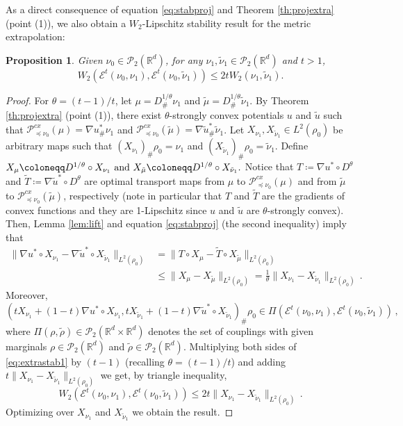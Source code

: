 \documentclass[12pt]{amsart}
\def\mc#1{\mathcal{#1}}
\newtheorem{proposition}{Proposition}
\begin{document}
As a direct consequence of equation \eqref{eq:stabproj} and Theorem \ref{th:projextra} (point (1)), we also obtain a $W_2$-Lipschitz stability result for the metric extrapolation:
\begin{proposition}\label{prop:extralip} Given  $\nu_0 \in \mc{P}_2(\mathbb{R}^d)$, for any $\nu_1, \tilde{\nu}_1\in\mc{P}_2(\mathbb{R}^d)$ and $t>1$,
\begin{equation}\label{eq:extralip}
W_2(\mathscr{E}^t(\nu_0,\nu_1),\mathscr{E}^t(\nu_0,\tilde{\nu}_1)) \leq 2t W_2(\nu_1,\tilde{\nu}_1).
\end{equation}
\end{proposition}
\begin{proof} 
For $\theta = (t-1)/t$, 
let $\mu = D^{1/\theta}_\# \nu_1$ and $ \tilde{\mu} = D^{1/\theta}_\# \tilde{\nu}_1$. By Theorem \ref{th:projextra} (point (1)), there exist $\theta$-strongly convex potentials $u$ and $\tilde{u}$ such that $\mathscr{P}^{cx}_{\preceq \nu_0}(\mu) = \nabla u^*_\# \nu_1$ and $\mathscr{P}^{cx}_{\preceq \nu_0}(\tilde{\mu}) = \nabla \tilde{u}^*_\# \tilde{\nu}_1$. 
Let $X_{\nu_1}, X_{\tilde{\nu}_1}\in L^2(\rho_0)$ be arbitrary maps such that $(X_{\nu_1})_\# \rho_0 = \nu_1$ and $(X_{\tilde{\nu}_1})_\# \rho_0 = \tilde{\nu}_1$. 
{Define
$\hbox{$X_\mu \coloneqq D^{1/\theta} \circ X_{\nu_1}$ and $X_{\tilde{\mu}} \coloneqq D^{1/\theta} \circ X_{\tilde{\nu}_1}$.}$
 Notice that  $T\coloneqq \nabla u^* \circ D^{\theta}$ and $\tilde{T} \coloneqq \nabla \tilde{u}^* \circ D^\theta$ are optimal transport maps  from $\mu$ to $\mathscr{P}^{cx}_{\preceq \nu_0}(\mu)$ and from $\tilde{\mu}$ to $\mathscr{P}^{cx}_{\preceq \nu_0}(\tilde{\mu})$, respectively (note in particular that $T$ and $\tilde{T}$ are the gradients of convex functions and they are 1-Lipschitz since $u$ and $\tilde{u}$ are} $\theta$-strongly convex).
Then, Lemma \ref{lem:lift} and equation \eqref{eq:stabproj} (the second inequality) imply that
\begin{align}\label{eq:extrastab1}
\|\nabla u^*\circ X_{\nu_1} - \nabla \tilde{u}^*\circ X_{\tilde{\nu}_1}\|_{L^2(\rho_0)}&  = \| T\circ X_\mu - \tilde{T}\circ X_{\tilde{\mu}} \|_{L^2(\rho_0)} \\\nonumber
& \le  \|  X_\mu -  X_{\tilde{\mu}} \|_{L^2(\rho_0)}
 = \frac{1}{\theta} \|X_{\nu_1} - X_{\tilde{\nu}_1}\|_{L^2(\rho_0)}\,.
\end{align}
Moreover, \[(tX_{\nu_1} + (1-t) \nabla u^*\circ X_{\nu_1},tX_{\tilde{\nu}_1} + (1-t)  \nabla \tilde{u}^*\circ X_{\tilde{\nu}_1})_\# \rho_0 \in \Pi(\mathscr{E}^t(\nu_0,\nu_1), \mathscr{E}^t(\nu_0,\tilde{\nu}_1))\,,\]
where $\Pi(\rho,\tilde{\rho})\in\mc{P}_2(\mathbb{R}^d\times \mathbb{R}^d)$ denotes the set of couplings with given marginals $\rho\in\mc{P}_2(\mathbb{R}^d)$ and $\tilde{\rho}\in\mc{P}_2(\mathbb{R}^d)$. Multiplying both sides of \eqref{eq:extrastab1} by $(t-1)$ (recalling $\theta = (t-1)/t$) and adding $t\|X_{\nu_1} - X_{\tilde{\nu}_1}\|_{L^2(\rho_0)}$ we get, by triangle inequality,
\[
{W_2(\mathscr{E}^t(\nu_0,\nu_1),\mathscr{E}^t(\nu_0,\tilde{\nu}_1))}\leq  2  t \|X_{\nu_1} - X_{\tilde{\nu}_1}\|_{L^2(\rho_0)}\,.
\]
Optimizing over $X_{\nu_1}$ and $ X_{\tilde{\nu}_1}$ we obtain the result. 
\end{proof}
\end{document}
